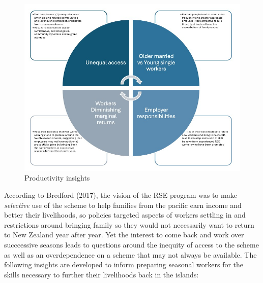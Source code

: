 \documentclass[9pt,a4paper,twocolumn,twoside]{tau-class/tau}
\begin{document}
	\begin{figure}[H]
    		\centering
    		\includegraphics[width=0.75\columnwidth]{figures/Insights_RSE.jpg}
    		\caption{Productivity insights}
    		\label{fig:backpacker}
    	\end{figure}



        According to Bredford (2017), the vision of the RSE program was to make \textit{selective} use of the scheme to help families from the pacific earn income and better their livelihoods, so policies targeted aspects of workers settling in and restrictions around bringing family so they would not necessarily want to return to New Zealand year after year. Yet the interest to come back and work over succcessive seasons leads to questions around the inequity of access to the scheme as well as an overdependence on a scheme that may not always be available. The following insights are developed to inform preparing seasonal workers for the skills necessary to further their livelihoods back in the islands:
\end{document}
